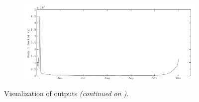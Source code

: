 \begin{figure}
\begin{subfigure}{\lafigsize}
      \includegraphics[width=\linewidth]{figures/Sparkling_ST1.pdf}
    \end{subfigure}
    \caption{\label{fig:la:outputs:1}Visualization of \la outputs \emph{(continued on )}.}
  \end{figure}
